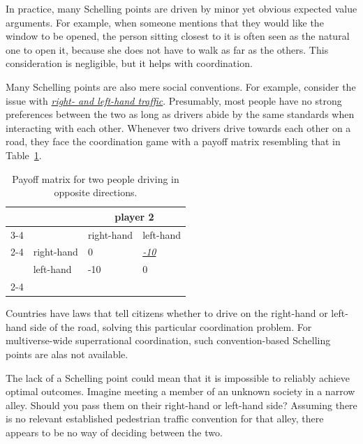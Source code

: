 In practice, many Schelling points are driven by minor yet obvious
expected value arguments. For example, when someone mentions that they
would like the window to be opened, the person sitting closest to it is
often seen as the natural one to open it, because she does not have to
walk as far as the others. This consideration is negligible, but it
helps with coordination.

Many Schelling points are also mere social conventions. For example,
consider the issue with
\href{https://en.wikipedia.org/wiki/Right-_and_left-hand_traffic}{\emph{right-
and left-hand traffic}}. Presumably, most people have no strong
preferences between the two as long as drivers abide by the same
standards when interacting with each other. Whenever two drivers drive
towards each other on a road, they face the coordination game with a
payoff matrix resembling that in Table~\ref{right-or-left-hand-traffic}.

\renewcommand{\arraystretch}{1.5}
\begin{table}[h!]
    \centering
    \begin{tabular}{p{1cm} p{2cm} p{2cm} p{2cm} }
        & & \multicolumn{2}{c}{player 2} \\
        \cmidrule[.2ex]{3-4}
         & & right-hand & left-hand\\
         \cmidrule[.1ex]{2-4}
        \multirow{2}{*}{player 1} & right-hand & 0 & \href{https://en.wikipedia.org/wiki/Wrong-way_driving}{\emph{-10}}\\
        & left-hand & -10 & 0\\
        \cmidrule[.2ex]{2-4}
    \end{tabular}
    \caption{Payoff matrix for two people driving in opposite directions.}
    \label{right-or-left-hand-traffic}
\end{table}

Countries have laws that tell citizens whether to drive on the
right-hand or left-hand side of the road, solving this particular
coordination problem. For multiverse-wide superrational coordination,
such convention-based Schelling points are alas not available.

The lack of a Schelling point could mean that it is impossible to
reliably achieve optimal outcomes. Imagine meeting a member of an
unknown society in a narrow alley. Should you pass them on their
right-hand or left-hand side? Assuming there is no relevant established
pedestrian traffic convention for that alley, there appears to be no way
of deciding between the two.


